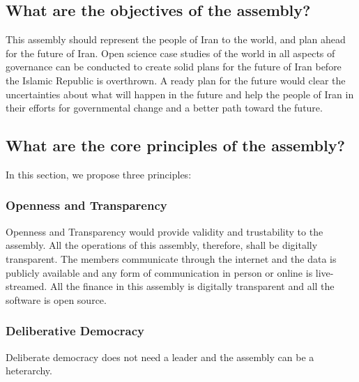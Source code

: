 \documentclass{IEEEtran}
\begin{document}
\subsection{What are the objectives of the assembly?}
This assembly should represent the people of Iran to the world, and plan ahead for the future of Iran.
Open science case studies of the world in all aspects of governance can be conducted to create solid plans for the future of Iran before the Islamic Republic is overthrown.
A ready plan for the future would clear the uncertainties about what will happen in the future and help the people of Iran in their efforts for governmental change and a better path toward the future.

\subsection{What are the core principles of the assembly?}
In this section, we propose three principles:
\subsubsection{Openness and Transparency}
Openness and Transparency would provide validity and trustability to the assembly. All the operations of this assembly, therefore, shall be digitally transparent. The members communicate through the internet and the data is publicly available and any form of communication in person or online is live-streamed. All the finance in this assembly is digitally transparent and all the software is open source.

\subsubsection{Deliberative Democracy}
Deliberate democracy does not need a leader and the assembly can be a heterarchy. 
\end{document}
